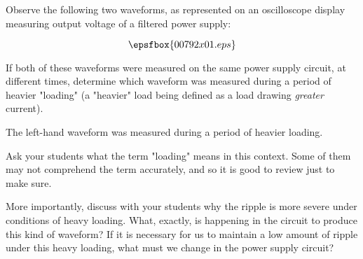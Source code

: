 

Observe the following two waveforms, as represented on an oscilloscope display measuring output voltage of a filtered power supply:

$$\epsfbox{00792x01.eps}$$

If both of these waveforms were measured on the same power supply circuit, at different times, determine which waveform was measured during a period of heavier "loading" (a "heavier" load being defined as a load drawing {\it greater} current).







The left-hand waveform was measured during a period of heavier loading.







Ask your students what the term "loading" means in this context.  Some of them may not comprehend the term accurately, and so it is good to review just to make sure.

More importantly, discuss with your students why the ripple is more severe under conditions of heavy loading.  What, exactly, is happening in the circuit to produce this kind of waveform?  If it is necessary for us to maintain a low amount of ripple under this heavy loading, what must we change in the power supply circuit?




